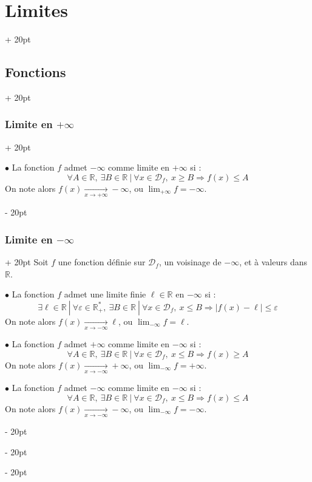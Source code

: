 \documentclass[a4paper, 12pt, twoside]{article}
\newcommand{\R}{\mathbb{R}} %
\newcommand{\tendsto}[1]{\xrightarrow[#1]{}}
\newcommand{\abs}[1]{\left\lvert #1 \right\rvert}
\renewcommand{\le}{\leqslant}
\renewcommand{\ge}{\geqslant}
\newcommand{\ep}{\varepsilon}
\newcommand{\ind}[1][20pt]{\advance\leftskip + #1}
\newcommand{\deind}[1][20pt]{\advance\leftskip - #1}
\newenvironment{indt}[2][20pt]{#2 \par \ind[#1]}{\par \deind} %
\begin{document}
\begin{indt}{\section{Limites}}
\begin{indt}{\subsection{Fonctions}}
\begin{indt}{\subsubsection{Limite en $+\infty$}}
                \vspace{6pt}
                
                $\bullet$ La fonction $f$ admet $-\infty$ comme limite en $+\infty$ si :
                \[
                    \forall A \in \R,\ \exists B \in \R\ |\ \forall x \in \mathcal D_f,\ x \ge B \Rightarrow f(x) \le A
                \]
                On note alors $f(x) \tendsto{x \to +\infty} -\infty$, ou $\displaystyle \lim_{+\infty} f = -\infty$.
            \end{indt}

            \vspace{12pt}
            
            \begin{indt}{\subsubsection{Limite en $-\infty$}}
                Soit $f$ une fonction définie sur $\mathcal D_f$, un voisinage de $-\infty$, et à valeurs dans $\R$.

                \vspace{6pt}
                
                $\bullet$ La fonction $f$ admet une limite finie $\ell \in \R$ en $-\infty$ si :
                \[
                    \exists \ell \in \R\ |\ \forall \ep \in \R_+^*,\ \exists B \in \R\ |\ \forall x \in \mathcal D_f,\ x \le B \Rightarrow \abs{f(x) - \ell} \le \ep
                \]
                On note alors $f(x) \tendsto{x \to -\infty} \ell$, ou $\displaystyle \lim_{-\infty} f = \ell$.

                \vspace{6pt}
                
                $\bullet$ La fonction $f$ admet $+\infty$ comme limite en $-\infty$ si :
                \[
                    \forall A \in \R,\ \exists B \in \R\ |\ \forall x \in \mathcal D_f,\ x \le B \Rightarrow f(x) \ge A
                \]
                On note alors $f(x) \tendsto{x \to -\infty} +\infty$, ou $\displaystyle \lim_{-\infty} f = +\infty$.

                \vspace{6pt}
                
                $\bullet$ La fonction $f$ admet $-\infty$ comme limite en $-\infty$ si :
                \[
                    \forall A \in \R,\ \exists B \in \R\ |\ \forall x \in \mathcal D_f,\ x \le B \Rightarrow f(x) \le A
                \]
                On note alors $f(x) \tendsto{x \to -\infty} -\infty$, ou $\displaystyle \lim_{-\infty} f = -\infty$.
            \end{indt}


\end{indt}
\end{indt}
\end{document}
